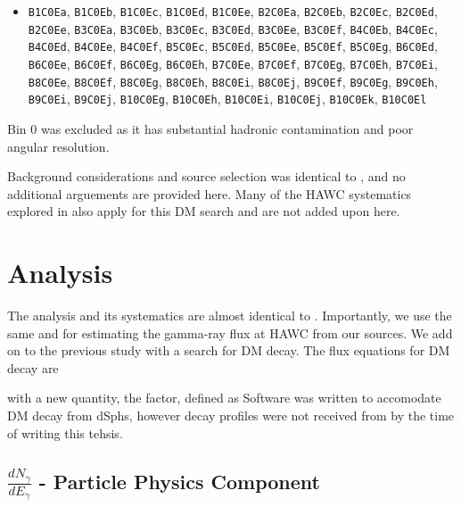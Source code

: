 \begin{itemize}
    \item[] \texttt{B1C0Ea}, \texttt{B1C0Eb}, \texttt{B1C0Ec}, \texttt{B1C0Ed}, \texttt{B1C0Ee}, \texttt{B2C0Ea}, \texttt{B2C0Eb}, \texttt{B2C0Ec}, \texttt{B2C0Ed}, \texttt{B2C0Ee}, \texttt{B3C0Ea}, \texttt{B3C0Eb}, \texttt{B3C0Ec}, \texttt{B3C0Ed}, \texttt{B3C0Ee}, \texttt{B3C0Ef}, \texttt{B4C0Eb}, \texttt{B4C0Ec}, \texttt{B4C0Ed}, \texttt{B4C0Ee}, \texttt{B4C0Ef}, \texttt{B5C0Ec}, \texttt{B5C0Ed}, \texttt{B5C0Ee}, \texttt{B5C0Ef}, \texttt{B5C0Eg}, \texttt{B6C0Ed}, \texttt{B6C0Ee}, \texttt{B6C0Ef}, \texttt{B6C0Eg}, \texttt{B6C0Eh}, \texttt{B7C0Ee}, \texttt{B7C0Ef}, \texttt{B7C0Eg}, \texttt{B7C0Eh}, \texttt{B7C0Ei}, \texttt{B8C0Ee}, \texttt{B8C0Ef}, \texttt{B8C0Eg}, \texttt{B8C0Eh}, \texttt{B8C0Ei}, \texttt{B8C0Ej}, \texttt{B9C0Ef}, \texttt{B9C0Eg}, \texttt{B9C0Eh}, \texttt{B9C0Ei}, \texttt{B9C0Ej}, \texttt{B10C0Eg}, \texttt{B10C0Eh}, \texttt{B10C0Ei}, \texttt{B10C0Ej}, \texttt{B10C0Ek}, \texttt{B10C0El}
\end{itemize}
Bin 0 was excluded as it has substantial hadronic contamination and poor angular resolution.

Background considerations and source selection was identical to , and no additional arguements are provided here.
Many of the HAWC systematics explored in  also apply for this DM search and are not added upon here.

\section{Analysis}\label{sec:mtd_analysis}

The analysis and its systematics are almost identical to .
Importantly, we use the same  and  for estimating the gamma-ray flux at HAWC from our sources.
We add on to the previous study with a search for DM decay.
The flux equations for DM decay are
\iddmdecay[\gamma]

with a new quantity, the \D factor, defined as
\dfactor
Software was written to accomodate DM decay from dSphs, however decay profiles were not received from \LS by the time of writing this tehsis.

\subsection{$\frac{dN_\gamma}{dE_\gamma}$ - Particle Physics Component}\label{sec:mtd_particlephysics}

